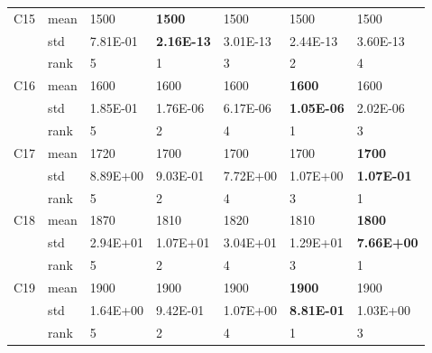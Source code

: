 \begin{table}[]
\begin{tabular}{|l|l|l|l|l|l|l|}
\multirow{3}{*}{C15} & mean & 1500              & \textbf{1500}     & 1500              & 1500              & 1500              \\ \cline{2-7} 
                     & std  & 7.81E-01          & \textbf{2.16E-13} & 3.01E-13          & 2.44E-13          & 3.60E-13          \\ \cline{2-7} 
                     & rank & 5                 & 1                 & 3                 & 2                 & 4                 \\ \hline
\multirow{3}{*}{C16} & mean & 1600              & 1600              & 1600              & \textbf{1600}     & 1600              \\ \cline{2-7} 
                     & std  & 1.85E-01          & 1.76E-06          & 6.17E-06          & \textbf{1.05E-06} & 2.02E-06          \\ \cline{2-7} 
                     & rank & 5                 & 2                 & 4                 & 1                 & 3                 \\ \hline
\multirow{3}{*}{C17} & mean & 1720              & 1700              & 1700              & 1700              & \textbf{1700}     \\ \cline{2-7} 
                     & std  & 8.89E+00          & 9.03E-01          & 7.72E+00          & 1.07E+00          & \textbf{1.07E-01} \\ \cline{2-7} 
                     & rank & 5                 & 2                 & 4                 & 3                 & 1                 \\ \hline
\multirow{3}{*}{C18} & mean & 1870              & 1810              & 1820              & 1810              & \textbf{1800}     \\ \cline{2-7} 
                     & std  & 2.94E+01          & 1.07E+01          & 3.04E+01          & 1.29E+01          & \textbf{7.66E+00} \\ \cline{2-7} 
                     & rank & 5                 & 2                 & 4                 & 3                 & 1                 \\ \hline
\multirow{3}{*}{C19} & mean & 1900              & 1900              & 1900              & \textbf{1900}     & 1900              \\ \cline{2-7} 
                     & std  & 1.64E+00          & 9.42E-01          & 1.07E+00          & \textbf{8.81E-01} & 1.03E+00          \\ \cline{2-7} 
                     & rank & 5                 & 2                 & 4                 & 1                 & 3                 \\ \hline

\end{tabular}
\end{table}
